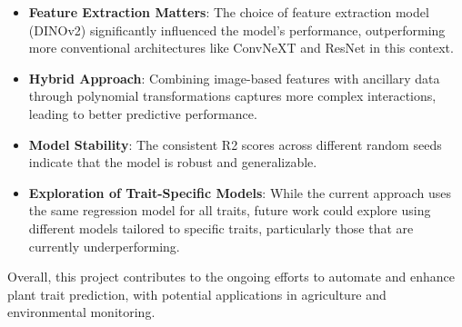 \documentclass{article}
\begin{document}
\begin{itemize}
	\item \textbf{Feature Extraction Matters}: The choice of feature extraction model (DINOv2) significantly influenced the model's performance, outperforming more conventional architectures like ConvNeXT and ResNet in this context.
	\item \textbf{Hybrid Approach}: Combining image-based features with ancillary data through polynomial transformations captures more complex interactions, leading to better predictive performance.
	\item \textbf{Model Stability}: The consistent R2 scores across different random seeds indicate that the model is robust and generalizable.
	\item \textbf{Exploration of Trait-Specific Models}: While the current approach uses the same regression model for all traits, future work could explore using different models tailored to specific traits, particularly those that are currently underperforming.
\end{itemize}

Overall, this project contributes to the ongoing efforts to automate and enhance plant trait prediction, with potential applications in agriculture and environmental monitoring.

\newpage

\nocite{*}
\printbibliography[title=References]
\end{document}
